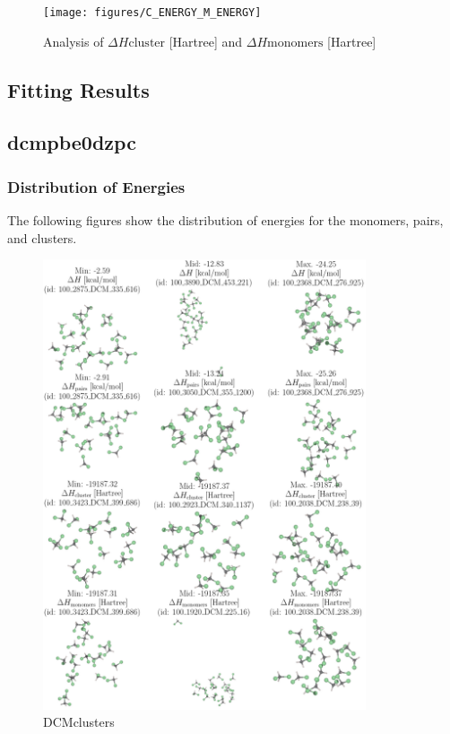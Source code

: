 \documentclass[journal=jacsat,manuscript=article]{achemso}
\begin{document}
\begin{figure}
    \centering
    \texttt{[image: figures/C\_ENERGY\_M\_ENERGY]}
    \caption{ Analysis of $\Delta H{\mathrm{cluster}}$ [Hartree] and $\Delta H{\mathrm{monomers}}$ [Hartree] }
    \label{fig:_C_ENERGY_M_ENERGY}
\end{figure}
\newpage 
 \subsection{Fitting Results}
\subsection{dcmpbe0dzpc}
\subsubsection{Distribution of Energies} 
 The following figures show the distribution of energies for the monomers, pairs, and clusters.

\begin{figure}
    \centering
    \includegraphics[width=0.85\textwidth]{figures/DCMclustersmols}
    \caption{ DCMclusters }
    \label{fig:DCMclustersmols}
\end{figure}
\end{document}
